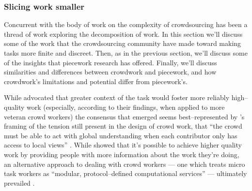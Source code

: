 \documentclass[trackingWork]{subfiles}
\begin{document}
\subsubsection[slicing work into smaller parts]{Slicing work smaller
}\label{sec:Slicing}

Concurrent with the body of work on the complexity of crowdsourcing
has been a thread of work exploring the decomposition of work.
In this section we'll discuss some of the work that
the crowdsourcing community have made toward making tasks more finite and discreet.
Then, as in the previous section,
we'll discuss some of the insights that piecework research has offered.
Finally, we'll discuss similarities and differences between crowdwork and piecework,
and how crowdwork's limitations and potential differ from piecework's.

\subsubsubsection{\crowdworkpers}

While \citeauthor{Kinnaird:2012:WTM:2389176.2389219}
advocated that
greater context of the task would foster more reliably high--quality work
(especially, according to their findings, when applied to more veteran crowd workers)
the consensus that emerged
seems best--represented by \citeauthor{verroios2014context}'s framing of
the tension still present in the design of crowd work, that
``the crowd must be able to act with
global understanding when each contributor only has access to local views''
\cite{Kinnaird:2012:WTM:2389176.2389219,verroios2014context}.
While \citeauthor{Kinnaird:2012:WTM:2389176.2389219} showed that
it's possible to achieve higher quality work by
providing people with more information about the work they're doing,
an alternative approach to dealing with crowd workers
--- one which treats micro task workers as
``modular, protocol--defined computational services'' ---
ultimately prevailed
\cite{Kinnaird:2012:WTM:2389176.2389219,irani2015cultural}.

\end{document}
